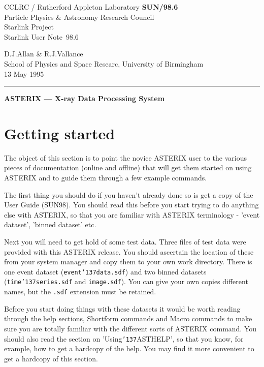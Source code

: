 \documentclass{book}
\newcommand{\stardoccategory}  {Starlink User Note}
\newcommand{\stardocinitials}  {SUN}
\newcommand{\stardocnumber}    {98.6}
\newcommand{\stardocauthors}   {D.J.Allan \& R.J.Vallance}
\newcommand{\stardocdate}      {13 May 1995}
\newcommand{\stardoctitle}     {ASTERIX --- X-ray Data Processing System}
\newcommand{\stardocname}{\stardocinitials /\stardocnumber}
\renewcommand{\_}{{\tt\char'137}}     %
\begin{document}
\thispagestyle{empty}
CCLRC / {\sc Rutherford Appleton Laboratory} \hfill {\bf \stardocname}\\
{\large Particle Physics \& Astronomy Research Council}\\
{\large Starlink Project\\}
{\large \stardoccategory\ \stardocnumber}

\begin{flushright}
\stardocauthors\\
School of Physics and Space Researc, University of Birmingham\\
\stardocdate
\end{flushright}
\vspace{-4mm}
\rule{\textwidth}{0.5mm}
\vspace{5mm}
\begin{center}
{\Large\bf \stardoctitle}
\end{center}
\vspace{5mm}
\setlength{\parskip}{0mm}
\tableofcontents
\setlength{\parskip}{\medskipamount}
\markright{\stardocname}
\chapter{Getting started}
The object of this section is to point the novice ASTERIX user to the
various pieces of documentation (online and offline) that will get them
started on using ASTERIX and to guide them through a few example
commands.

The first thing you should do if you haven't already done so is get a
copy of the User Guide (SUN98). You should read this before you start
trying to do anything else with ASTERIX, so that you are familiar with
ASTERIX terminology - 'event dataset', 'binned dataset' etc.

Next you will need to get hold of some test data. Three files of test
data were provided with this ASTERIX release. You should ascertain the
location of these from your system manager and copy them to your own
work directory. There is one event dataset ({\tt event\_data.sdf}) and two
binned datasets ({\tt time\_series.sdf} and {\tt image.sdf}). You can give your own
copies different names, but the {\tt .sdf} extension must be retained.

Before you start doing things with these datasets it would be worth
reading through the help sections, Shortform commands and
Macro commands to make sure you are totally familiar with the different
sorts of ASTERIX command. You should also read the section on
'Using\_ASTHELP', so that you know, for example, how to get a hardcopy
of the help. You may find it more convenient to get a hardcopy of
this section.
\end{document}
